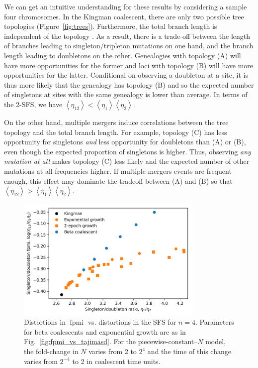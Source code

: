 \documentclass[11pt, letterpaper]{article}   	%
\newcommand{\fig}[1]{Fig.~\ref{#1}}
\newcommand{\Fig}[1]{Figure~\ref{#1}}
\newcommand{\E}[1]{\left< #1 \right>}
\DeclareMathOperator{\fpmi}{fpmi}
\begin{document}
We can get an intuitive understanding for these results by considering a sample four chromosomes.
In the Kingman coalescent, there are only two possible tree topologies (\Fig{fig:trees}).
Furthermore, the total branch length is independent of the topology \cite{Wakeley2009}.
As a result, there is a trade-off between the length of branches leading to singleton/tripleton mutations on one hand, and the branch length leading to doubletons on the other.
Genealogies with topology (A) will have more opportunities for the former and loci with topology (B) will have more opportunities for the latter.
Conditional on observing a doubleton at a site, it is thus more likely that the genealogy has topology (B) and so the expected number of singletons at sites with the same genealogy is lower than average.
In terms of the 2-SFS, we have $\E{\eta_{12}} < \E{\eta_{1}} \E{\eta_{2}}$.

On the other hand, multiple mergers induce correlations between the tree topology and the total branch length.
For example, topology (C) has less opportunity for singletons \emph{and} less opportunity for doubletons than (A) or (B), even though the expected proportion of singletons is higher.
Thus, observing \emph{any mutation at all} makes topology (C) less likely and the expected number of other mutations at all frequencies higher.
If multiple-mergers events are frequent enough, this effect may dominate the tradeoff between (A) and (B) so that $\E{\eta_{12}} > \E{\eta_{1}} \E{\eta_{2}}$.

\begin{figure}
\centering
\includegraphics[width=0.8\textwidth]{figures/figure3.pdf}
\caption{Distortions in $\fpmi$ vs. distortions in the SFS for $n=4$. Parameters for beta coalescents and exponential growth are as in \fig{fig:fpmi_vs_tajimasd}. For the piecewise-constant--$N$ model, the fold-change in $N$ varies from 2 to $2^4$ and the time of this change varies from $2^{-4}$ to 2 in coalescent time units. \label{fig:sdpmi_vs_sdratio}}
\end{figure}
\end{document}
